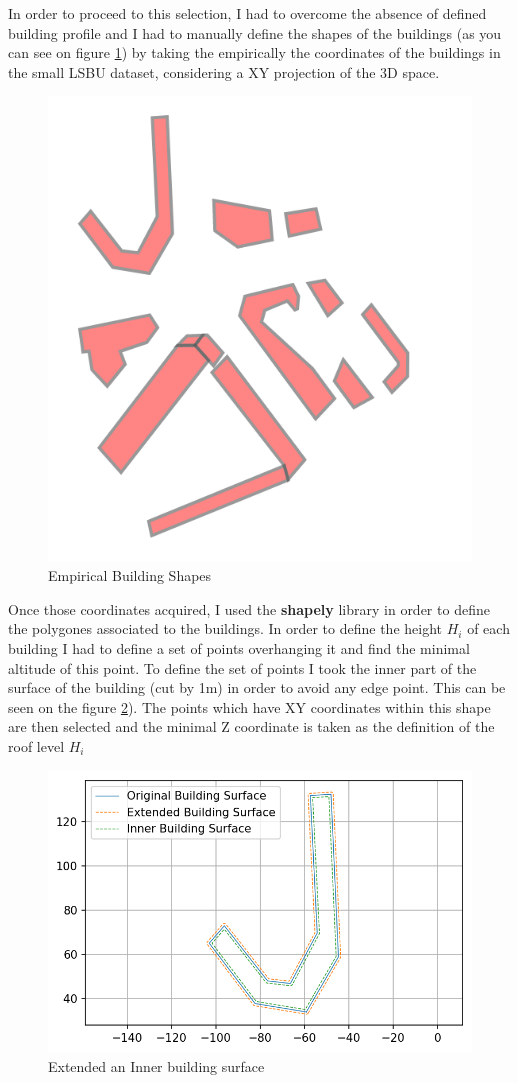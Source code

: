 In order to proceed to this selection, I had to overcome the absence of defined building profile and I had to manually define the shapes of the buildings (as you can see on figure \ref{fig:buildingshapes}) by taking the empirically the coordinates of the buildings in the small LSBU dataset, considering a XY projection of the 3D space. \\

\begin{figure}[h]
\centering
	\includegraphics[width = 0.25 \textwidth]{figures/Subset/buildingShapes_13}
	\caption{Empirical Building Shapes}
	\label{fig:buildingshapes}
\end{figure}

Once those coordinates acquired, I used the \textbf{shapely} library  \citep{noauthor_shapely_2019} in order to define the polygones associated to the buildings. In order to define the height $H_i$ of each building I had to define a set of points overhanging it and find the minimal altitude of this point.  To define the set of points I took the inner part of the surface of the building (cut by 1m) in order to avoid any edge point. This can be seen on the figure \ref{fig:inner_outer_building}). The points which have XY coordinates within this shape are then selected and the minimal Z coordinate is taken as the definition of the roof level $H_i$ \\


\begin{figure}[h]
\centering
	\includegraphics[width = 0.7 \textwidth]{figures/Subset/BuildingSurfaceBuffer}
	\caption{Extended an Inner building surface}
	\label{fig:inner_outer_building}
\end{figure}

